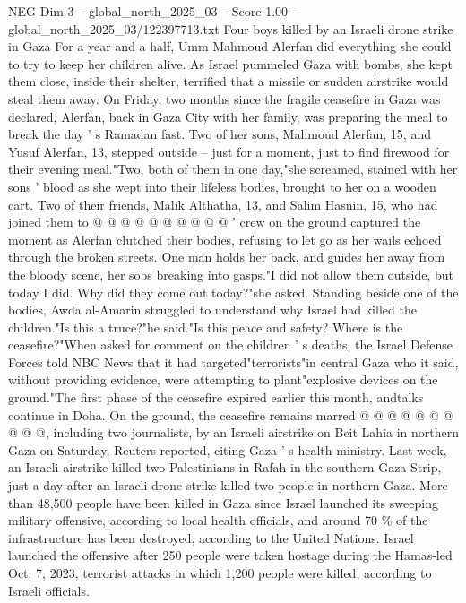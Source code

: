\begin{textsample}{NEG Dim 3 – global\_north\_2025\_03 – Score 1.00 – global\_north\_2025\_03/122397713.txt}  \label{ex:f3_neg_436}
Four boys killed by an Israeli drone strike in Gaza For a year and a half, Umm Mahmoud Alerfan did everything she could to try to keep her children alive.
As Israel pummeled Gaza with bombs, she kept them close, inside their shelter, terrified that a missile or sudden airstrike would steal them away.
On Friday, two months since the fragile ceasefire in Gaza was declared, Alerfan, back in Gaza City with her family, was preparing the meal to break the day ' s Ramadan fast.
Two of her sons, Mahmoud Alerfan, 15, and Yusuf Alerfan, 13, stepped outside -- just for a moment, just to find firewood for their evening meal."Two, both of them in one day,"she screamed, stained with her sons ' blood as she wept into their lifeless bodies, brought to her on a wooden cart.
Two of their friends, Malik Althatha, 13, and Salim Hasnin, 15, who had joined them to @ @ @ @ @ @ @ @ @ @ ' crew on the ground captured the moment as Alerfan clutched their bodies, refusing to let go as her wails echoed through the broken streets.
One man holds her back, and guides her away from the bloody scene, her sobs breaking into gasps."I did not allow them outside, but today I did.
Why did they come out today?"she asked.
Standing beside one of the bodies, Awda al-Amarin struggled to understand why Israel had killed the children."Is this a truce?"he said."Is this peace and safety?
Where is the ceasefire?"When asked for comment on the children ' s deaths, the Israel Defense Forces told NBC News that it had targeted"terrorists"in central Gaza who it said, without providing evidence, were attempting to plant"explosive devices on the ground."The first phase of the ceasefire expired earlier this month, andtalks continue in Doha.
On the ground, the ceasefire remains marred @ @ @ @ @ @ @ @ @ @, including two journalists, by an Israeli airstrike on Beit Lahia in northern Gaza on Saturday, Reuters reported, citing Gaza ' s health ministry.
Last week, an Israeli airstrike killed two Palestinians in Rafah in the southern Gaza Strip, just a day after an Israeli drone strike killed two people in northern Gaza.
More than 48,500 people have been killed in Gaza since Israel launched its sweeping military offensive, according to local health officials, and around 70 \% of the infrastructure has been destroyed, according to the United Nations.
Israel launched the offensive after 250 people were taken hostage during the Hamas-led Oct. 7, 2023, terrorist attacks in which 1,200 people were killed, according to Israeli officials.

\end{textsample}
